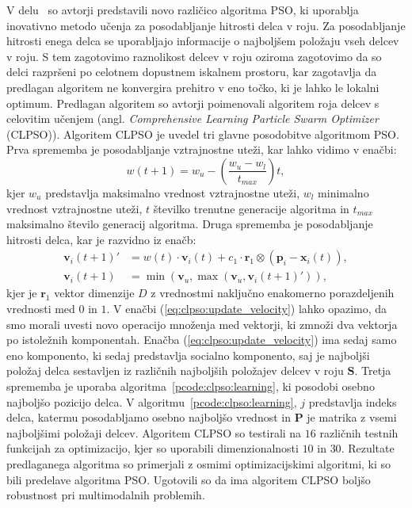 V delu~\cite{alg:clpso} so avtorji predstavili novo različico algoritma PSO, ki uporablja inovativno metodo učenja za posodabljanje hitrosti delca v roju.
Za posodabljanje hitrosti enega delca se uporabljajo informacije o najboljšem položaju vseh delcev v roju.
S tem zagotovimo raznolikost delcev v roju oziroma zagotovimo da so delci razpršeni po celotnem dopustnem iskalnem prostoru, kar zagotavlja da predlagan algoritem ne konvergira prehitro v eno točko, ki je lahko le lokalni optimum.
Predlagan algoritem so avtorji poimenovali algoritem roja delcev s celovitim učenjem (angl. \textit{Comprehensive Learning Particle Swarm Optimizer} (CLPSO)).
Algoritem CLPSO je uvedel tri glavne posodobitve algoritmom PSO.
Prva sprememba je posodabljanje vztrajnostne uteži, kar lahko vidimo v enačbi:
\begin{equation}
    w(t + 1) = w_u - \left( \frac{w_u - w_l}{t_{max}} \right) t, \label{eq:clpso:w_update}
\end{equation}
kjer $w_u$ predstavlja maksimalno vrednost vztrajnostne uteži, $w_l$ minimalno vrednost vztrajnostne uteži, $t$ številko trenutne generacije algoritma in $t_{max}$ maksimalno število generacij algoritma.
Druga sprememba je posodabljanje hitrosti delca, kar je razvidno iz enačb:
\begin{align}
    \mathbf{v}_i(t + 1)' &= w(t) \cdot \mathbf{v}_i(t) + c_1 \cdot \mathbf{r}_1 \otimes (\mathbf{p}_i - \mathbf{x}_i(t))\label{eq:clpso:update_velocity}, \\
    \mathbf{v}_i(t + 1) &= \min(\mathbf{v}_u, \max(\mathbf{v}_u, \mathbf{v}_i(t + 1)')) \label{eq:clpso:update_velocity_after},
\end{align}
kjer je $\mathbf{r}_1$ vektor dimenzije $\mathit{D}$ z vrednostmi naključno enakomerno porazdeljenih vrednosti med $0$ in $1$.
V enačbi (\ref{eq:clpso:update_velocity}) lahko opazimo, da smo morali uvesti novo operacijo množenja med vektorji, ki zmnoži dva vektorja po istoležnih komponentah.
Enačba (\ref{eq:clpso:update_velocity}) ima sedaj samo eno komponento, ki sedaj predstavlja socialno komponento, saj je najboljši položaj delca sestavljen iz različnih najboljših položajev delcev v roju $\mathbf{S}$.
Tretja sprememba je uporaba algoritma~\ref{pcode:clpso:learning}, ki posodobi osebno najboljšo pozicijo delca.
V algoritmu~\ref{pcode:clpso:learning}, $j$ predstavlja indeks delca, katermu posodabljamo osebno najboljšo vrednost in $\mathbf{P}$ je matrika z vsemi najboljšimi položaji delcev.
Algoritem CLPSO so testirali na $16$ različnih testnih funkcijah za optimizacijo, kjer so uporabili dimenzionalnosti $10$ in $30$.
Rezultate predlaganega algoritma so primerjali z osmimi optimizacijskimi algoritmi, ki so bili predelave algoritma PSO.
Ugotovili so da ima algoritem CLPSO boljšo robustnost pri multimodalnih problemih. 

